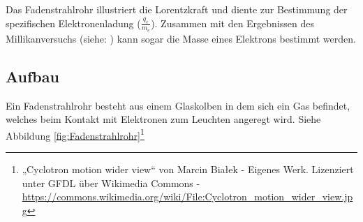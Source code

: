 




%
%	





Das Fadenstrahlrohr illustriert die Lorentzkraft und diente zur Bestimmung der spezifischen Elektronenladung ($\frac{q_e}{m_e}$). Zusammen mit den Ergebnissen des Millikanversuchs (siehe: ) kann sogar die Masse eines Elektrons bestimmt werden.

\subsection{Aufbau}

Ein Fadenstrahlrohr besteht aus einem Glaskolben in dem sich ein Gas befindet, welches beim Kontakt mit Elektronen zum Leuchten angeregt wird. Siehe Abbildung \ref{fig:Fadenstrahlrohr}\footnote{„Cyclotron motion wider view“ von Marcin Białek - Eigenes Werk. Lizenziert unter GFDL über Wikimedia Commons - \url{https://commons.wikimedia.org/wiki/File:Cyclotron\_motion\_wider\_view.jpg}}

